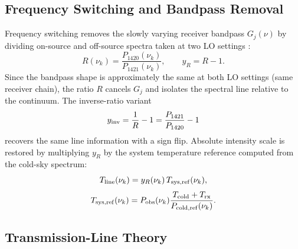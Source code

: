 \documentclass[10pt,preprint2]{aastex}
\begin{document}
\subsection{Frequency Switching and Bandpass Removal}
\label{sec:theory_freqswitch}

Frequency switching removes the slowly varying receiver bandpass $G_j(\nu)$
by dividing on-source and off-source spectra taken at two LO settings
\citep{parsons2024calintensity}:
\begin{equation}
  R(\nu_k) = \frac{P_{1420}(\nu_k)}{P_{1421}(\nu_k)},
  \qquad
  y_R = R - 1.
\end{equation}
Since the bandpass shape is approximately the same at both LO settings
(same receiver chain), the ratio $R$ cancels $G_j$ and isolates the
spectral line relative to the continuum.
The inverse-ratio variant
\begin{equation}
  y_{\rm inv} = \frac{1}{R} - 1
    = \frac{P_{1421}}{P_{1420}} - 1
\end{equation}
recovers the same line information with a sign flip.
Absolute intensity scale is restored by multiplying $y_R$ by the
system temperature reference computed from the cold-sky spectrum:
\begin{equation}
  T_{\rm line}(\nu_k) = y_R(\nu_k)\,T_{\rm sys,ref}(\nu_k),
\end{equation}
\begin{equation}
  T_{\rm sys,ref}(\nu_k) = P_{\rm obs}(\nu_k)
  \frac{T_{\rm cold} + T_{\rm rx}}{P_{\rm cold,ref}(\nu_k)}.
\end{equation}

\subsection{Transmission-Line Theory}
\label{sec:theory_tline}
\end{document}
